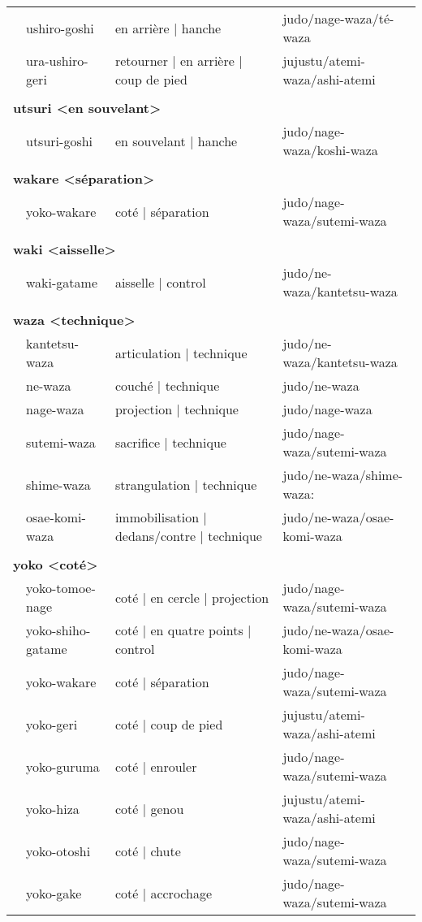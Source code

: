 \documentclass{article}%
\begin{document}
\begin{longtable}{rlll}
&ushiro{-}goshi&en arrière | hanche&judo/nage{-}waza/té{-}waza\\%
&ura{-}ushiro{-}geri&retourner | en arrière | coup de pied&jujustu/atemi{-}waza/ashi{-}atemi\\%
&&&\\%
\multicolumn{3}{l}{\textbf{utsuri <en souvelant>}%
~%
}&\\%
&utsuri{-}goshi&en souvelant | hanche&judo/nage{-}waza/koshi{-}waza\\%
&&&\\%
\multicolumn{3}{l}{\textbf{wakare <séparation>}%
~%
}&\\%
&yoko{-}wakare&coté | séparation&judo/nage{-}waza/sutemi{-}waza\\%
&&&\\%
\multicolumn{3}{l}{\textbf{waki <aisselle>}%
~%
}&\\%
&waki{-}gatame&aisselle | control&judo/ne{-}waza/kantetsu{-}waza\\%
&&&\\%
\multicolumn{3}{l}{\textbf{waza <technique>}%
~%
}&\\%
&kantetsu{-}waza&articulation | technique&judo/ne{-}waza/kantetsu{-}waza\\%
&ne{-}waza&couché | technique&judo/ne{-}waza\\%
&nage{-}waza&projection | technique&judo/nage{-}waza\\%
&sutemi{-}waza&sacrifice | technique&judo/nage{-}waza/sutemi{-}waza\\%
&shime{-}waza&strangulation | technique&judo/ne{-}waza/shime{-}waza:\\%
&osae{-}komi{-}waza&immobilisation | dedans/contre | technique&judo/ne{-}waza/osae{-}komi{-}waza\\%
&&&\\%
\multicolumn{3}{l}{\textbf{yoko <coté>}%
~%
}&\\%
&yoko{-}tomoe{-}nage&coté | en cercle | projection&judo/nage{-}waza/sutemi{-}waza\\%
&yoko{-}shiho{-}gatame&coté | en quatre points | control&judo/ne{-}waza/osae{-}komi{-}waza\\%
&yoko{-}wakare&coté | séparation&judo/nage{-}waza/sutemi{-}waza\\%
&yoko{-}geri&coté | coup de pied&jujustu/atemi{-}waza/ashi{-}atemi\\%
&yoko{-}guruma&coté | enrouler&judo/nage{-}waza/sutemi{-}waza\\%
&yoko{-}hiza&coté | genou&jujustu/atemi{-}waza/ashi{-}atemi\\%
&yoko{-}otoshi&coté | chute&judo/nage{-}waza/sutemi{-}waza\\%
&yoko{-}gake&coté | accrochage&judo/nage{-}waza/sutemi{-}waza\\%
\end{longtable}%
\end{document}
